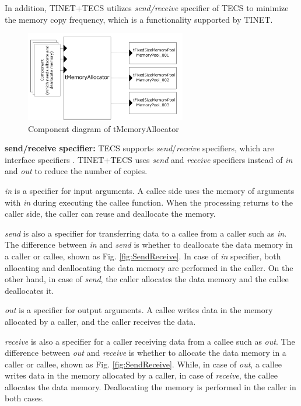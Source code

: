 \documentclass[conference]{IEEEtran/IEEEtran}
\begin{document}
In addition, TINET+TECS utilizes {\it send/receive} specifier of TECS to minimize the memory copy frequency, which is a functionality supported by TINET.

\begin{figure}[t]
    \centering
    \includegraphics[width=7.0cm,clip]{figure/tMemoryAllocator.pdf}
    \caption{Component diagram of tMemoryAllocator}
    \label{fig:tMemoryAllocator}
\end{figure}

{\bf send/receive specifier:}
TECS supports {\it send}/{\it receive} specifiers, which are interface specifiers \cite{par:RPC}.
TINET+TECS uses {\it send} and {\it receive} specifiers instead of {\it in} and {\it out} to reduce the number of copies.

{\it in} is a specifier for input arguments.
A callee side uses the memory of arguments with {\it in} during executing the callee function.
When the processing returns to the caller side, the caller can reuse and deallocate the memory.

{\it send} is also a specifier for transferring data to a callee from a caller such as {\it in}.
The difference between {\it in} and {\it send} is whether to deallocate the data memory in a caller or callee, shown as Fig. \ref{fig:SendReceive}.
In case of {\it in} specifier, both allocating and deallocating the data memory are performed in the caller.
On the other hand, in case of {\it send}, the caller allocates the data memory and the callee deallocates it.

{\it out} is a specifier for output arguments.
A callee writes data in the memory allocated by a caller, and the caller receives the data.

{\it receive} is also a specifier for a caller receiving data from a callee such as {\it out}.
The difference between {\it out} and {\it receive} is whether to allocate the data memory in a caller or callee, shown as Fig. \ref{fig:SendReceive}.
While, in case of {\it out}, a callee writes data in the memory allocated by a caller, in case of {\it receive}, the callee allocates the data memory.
Deallocating the memory is performed in the caller in both cases.
\end{document}
